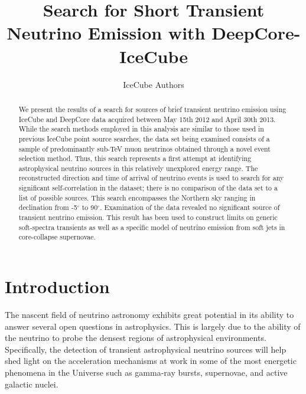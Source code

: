 \documentclass[manuscript]{aastex}
\begin{document}

\title{Search for Short Transient Neutrino Emission with DeepCore-IceCube}
\author{IceCube Authors}

\begin{abstract}
We present the results of a search for sources of brief transient neutrino emission using IceCube and DeepCore data acquired between May 15th 2012 and April 30th 2013. While the search methods employed in this analysis are similar to those used in previous IceCube point source searches, the data set being examined consists of a sample of predominantly sub-TeV muon neutrinos obtained through a novel event selection method. Thus, this search represents a first attempt at identifying astrophysical neutrino sources in this relatively unexplored energy range. The reconstructed direction and time of arrival of neutrino events is used to search for any significant self-correlation in the dataset; there is no comparison of the data set to a list of possible sources. This search encompasses the Northern sky ranging in declination from -5$^{\circ}$ to 90$^{\circ}$. Examination of the data revealed no significant source of transient neutrino emission. This result has been used to construct limits on generic soft-spectra transients as well as a specific model of neutrino emission from soft jets in core-collapse supernovae.
\end{abstract}




\section{Introduction}
The nascent field of neutrino astronomy exhibits great potential in its ability to answer several open questions in astrophysics. This is largely due to the ability of the neutrino to probe the densest regions of astrophysical environments. Specifically, the detection of transient astrophysical neutrino sources will help shed light on the acceleration mechanisms at work in some of the most energetic phenomena in the Universe such as gamma-ray bursts, supernovae, and active galactic nuclei.
\end{document}

